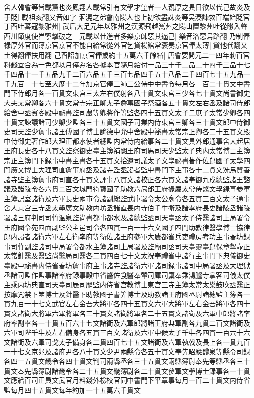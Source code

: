 舍人韓會等皆載黨也炎鳳翔人載常引有文學才望者一人親厚之異日欲以代己故炎及于貶|{
	載祖亥翻又音如字}
洄滉之弟會南陽人也上初欲盡誅炎等吴湊諫救百端始貶官　丁酉吐蕃寇黎雅州|{
	武后大足元年以雅州之漢源飛越嶲州之陽山置黎州吐從暾入聲}
西川節度使崔寧擊破之　元載以仕進者多樂京師惡其逼己|{
	樂音洛惡烏路翻}
乃制俸禄厚外官而薄京官京官不能自給常從外官乞貸楊綰常衮奏京官俸太薄|{
	貸他代翻又土得翻俸扶用翻}
己酉詔加京官俸歲約十五萬六千餘緡|{
	唐會要開元二十四年勑百官料錢宜合為一色都以月俸為名各據本官隨月給付一品三十千二品二十四千三品十七千四品十一千五品九千二百六品五千三百七品四千五十八品二千四百七十五九品一千九百一十七至大歷十二年加京官俸三師三公侍中中書令每月各一百二十貫文中書門下侍郎月各一百貫文東宫三太左右僕射各八十貫文東宫三少各七十貫文尚書御史大夫太常卿各六十貫文常寺宗正卿太子詹事國子祭酒各五十貫文左右丞及諸司侍郎給舍中丞賓客殿中祕書監司農等卿將作等監各四十五貫文太子二庶子太常少卿各四十貫文諫議諸司少卿少監各三十五貫文國子司業内侍東宫三卿各三十貫文郎中侍御史司天監少詹事諸王傅國子博士諭德中允中舍殿中袐書太常宗正卿各二十五貫文殿中侍御史著作郎大理正都水使者總監内常侍内給事各二十貫文員外郎通事舍人起居王府長史各十八貫文監察御史臺主簿補闕王府司馬司天少監太子典内太常博士主簿宗正主簿門下録事中書主書各十五貫文拾遺司議太子文學祕書著作佐郎國子太學四門廣文博士大理司直詹事府丞及諸寺監丞謁者監中書門下主事各十二貫文洗馬贊善諸寺監主簿詹事府司直各十貫文評事八貫文諸校正各六貫文諸奉御九成總監諸王諮議及諸陵令各六貫二百文城門符寶國子助教六局郎王府掾屬太常侍醫文學録事参軍主簿記室諸衛及六軍長史兩市令諸副總監武庫署令太公廟令各五貫三百文太子通事舍人東宫三寺丞太學廣文助教内坊丞諸直長内寺伯千牛衛及諸率府長史諸陵丞諸陵署諸王府判司司竹温泉監尚書都事都水及諸總監丞司天臺丞太子侍醫諸司上局署令王府國令苑四面副監公主邑司令各四貫一百一十六文國子四門助教律醫學博士協律郎内謁者諸衛六軍左右衛率府等衛佐諸王府參軍大農都省兵吏禮房考功主事春坊録事司竹副監諸司中局署令都水主簿諸司上局署及監廟司丞司天臺靈臺郎保章挈壺正太常針醫及醫監尚醫局司醫各二貫四百七十文太祝奉禮省中諸行主事門下典儀御史臺殿中祕書内侍省春坊詹事府主事諸寺監諸衛六軍諸司録事諸司中局署丞及大理獄丞諸司監作監事諸率府録事殿中省醫佐食醫奉輦司庫司廩奉乘鴻臚寺掌客司儀太僕主乘内坊典直司天臺司辰司歷監内侍省宫教博士東宫三寺主簿太常太樂鼓吹丞醫正按摩咒禁卜筮博士及針醫卜助教國子書筭博士及助教諸王府國丞尉諸總監主簿各一貫九百一十七文武官左右金吾大將軍各四十五貫文六軍大將軍左右金吾將軍各四十貫文諸衛大將軍六軍將軍各三十貫文諸衛將軍各二十五貫文諸衛及六軍中郎將諸率府率副率各一十貫五百六十七文諸衛及六軍郎將諸王府典軍副各九貫二百文諸衛及六軍司陛千牛及左右備身各五貫三百文諸衛及六軍中候太子千牛各四貫一百六十六文諸衛及六軍司戈太子備身各二貫四百七十五文諸衛及六軍執戟及長上各一貫九百一十七文京兆及諸府尹各八十貫文少尹兩縣令各五十貫文奉先昭應醴泉等縣令司録各四十五貫文畿令各四十貫文判司兩縣丞各三十五貫文兩縣簿尉奉先等縣丞各三十貫文奉先縣簿尉諸畿令各二十五貫文畿簿尉各二十貫文參軍文學博士録事各一十貫文應給百司正員文武官月料錢外檢校官同中書門下平章事每月一百二十貫文内侍省監每月四十五貫文每年約加一十五萬六千貫文}
